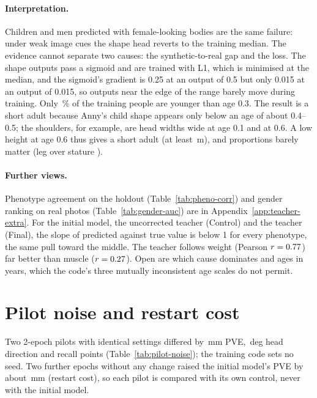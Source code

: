 \paragraph{Interpretation.} Children and men predicted with female-looking bodies are the same failure: under weak
image cues the shape head reverts to the training median. The evidence cannot separate two causes: the synthetic-to-real
gap and the loss. The shape outputs pass a sigmoid and are trained with L1, which is minimised at
the median, and the sigmoid's gradient is 0.25 at an output of 0.5 but only 0.015 at an output of 0.015, so outputs near the edge of
the range barely move during training. Only \DiagChildShare\,\% of the training people are younger than age 0.3. The result is a short adult because Anny's child shape appears only below an age of about 0.4--0.5;
the shoulders, for example, are \DiagShoulderHeadChild{} head widths wide at age 0.1 and \DiagShoulderHeadAdult{} at
0.6. A low height at age 0.6 thus gives a short adult (at least \DiagSmallestAdult\,m), and proportions barely matter
(leg over stature \DiagProportionsLeg).

\paragraph{Further views.} Phenotype agreement on the holdout (Table~\ref{tab:pheno-corr}) and gender ranking on real photos
(Table~\ref{tab:gender-auc}) are in Appendix~\ref{app:teacher-extra}. For
the initial model, the uncorrected teacher (Control) and the teacher (Final), the slope of predicted against true
value is below 1 for every phenotype, the same pull toward the middle. The teacher follows weight (Pearson $r =
0.77$) far better than muscle ($r = 0.27$). Open are which cause dominates and ages in
years, which the code's three mutually inconsistent age scales do not permit.

\section{Pilot noise and restart cost}
\label{sec:diag-noise}



Two 2-epoch pilots with identical settings differed by \DiagNoisePVE\,mm PVE, \DiagNoiseHead\,deg head direction and
\DiagNoiseRecall{} recall points (Table~\ref{tab:pilot-noise}); the training code sets no seed. Two further epochs
without any change raised the initial model's PVE by about \DiagRestartCost\,mm (restart cost), so each pilot is
compared with its own control, never with the initial model.

